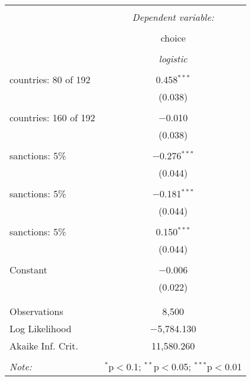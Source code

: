 
\begin{table}[!htbp] \centering 
  \caption{} 
  \label{tab:glm} 
\begin{tabular}{@{\extracolsep{5pt}}lc} 
\\[-1.8ex]\hline 
\hline \\[-1.8ex] 
 & \multicolumn{1}{c}{\textit{Dependent variable:}} \\ 
\cline{2-2} 
\\[-1.8ex] & choice \\ 
\\[-1.8ex] & \textit{logistic} \\ 
\hline \\[-1.8ex] 
 countries:  80 of 192 & 0.458$^{***}$ \\ 
  & (0.038) \\ 
  & \\ 
 countries:  160 of 192 & $-$0.010 \\ 
  & (0.038) \\ 
  & \\ 
 sanctions: 5\% & $-$0.276$^{***}$ \\ 
  & (0.044) \\ 
  & \\ 
 sanctions: 5\% & $-$0.181$^{***}$ \\ 
  & (0.044) \\ 
  & \\ 
 sanctions: 5\% & 0.150$^{***}$ \\ 
  & (0.044) \\ 
  & \\ 
 Constant & $-$0.006 \\ 
  & (0.022) \\ 
  & \\ 
\hline \\[-1.8ex] 
Observations & 8,500 \\ 
Log Likelihood & $-$5,784.130 \\ 
Akaike Inf. Crit. & 11,580.260 \\ 
\hline 
\hline \\[-1.8ex] 
\textit{Note:}  & \multicolumn{1}{r}{$^{*}$p$<$0.1; $^{**}$p$<$0.05; $^{***}$p$<$0.01} \\ 
\end{tabular} 
\end{table}  
